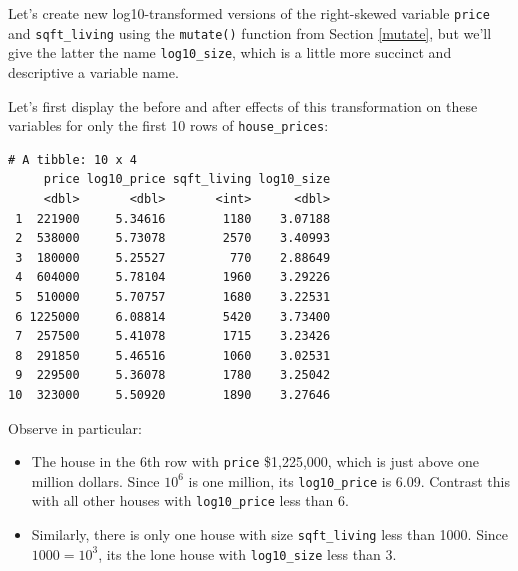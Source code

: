 \documentclass[12pt, krantz2,]{krantz}
\makeatletter
\newenvironment{Shaded}{\begin{snugshade}}{\end{snugshade}}
\newcommand{\DataTypeTok}[1]{\textcolor[rgb]{0.27,0.27,0.27}{#1}}
\newcommand{\KeywordTok}[1]{\textcolor[rgb]{0.27,0.27,0.27}{\textbf{#1}}}
\newcommand{\NormalTok}[1]{#1}
\newcommand{\OperatorTok}[1]{\textcolor[rgb]{0.43,0.43,0.43}{\textbf{#1}}}
\newcommand{\StringTok}[1]{\textcolor[rgb]{0.5,0.5,0.5}{#1}}
\providecommand{\tightlist}{%
  \setlength{\itemsep}{0pt}\setlength{\parskip}{0pt}}
\newenvironment{kframe}{%
\medskip{}
\setlength{\fboxsep}{.8em}
 \def\at@end@of@kframe{}%
 \ifinner\ifhmode%
  \def\at@end@of@kframe{\end{minipage}}%
  \begin{minipage}{\columnwidth}%
 \fi\fi%
 \def\FrameCommand##1{\hskip\@totalleftmargin \hskip-\fboxsep
 \colorbox{shadecolor}{##1}\hskip-\fboxsep
     \hskip-\linewidth \hskip-\@totalleftmargin \hskip\columnwidth}%
 \MakeFramed {\advance\hsize-\width
   \@totalleftmargin\z@ \linewidth\hsize
   \@setminipage}}%
 {\par\unskip\endMakeFramed%
 \at@end@of@kframe}
\renewenvironment{Shaded}{\begin{kframe}}{\end{kframe}}
\makeatother
\begin{document}
Let's create new log10-transformed versions of the right-skewed variable \texttt{price} and \texttt{sqft\_living} using the \texttt{mutate()} function from Section \ref{mutate}, but we'll give the latter the name \texttt{log10\_size}, which is a little more succinct and descriptive a variable name.

\begin{Shaded}
\end{Shaded}

Let's first display the before and after effects of this transformation on these variables for only the first 10 rows of \texttt{house\_prices}:

\begin{Shaded}
\end{Shaded}

\begin{verbatim}
# A tibble: 10 x 4
     price log10_price sqft_living log10_size
     <dbl>       <dbl>       <int>      <dbl>
 1  221900     5.34616        1180    3.07188
 2  538000     5.73078        2570    3.40993
 3  180000     5.25527         770    2.88649
 4  604000     5.78104        1960    3.29226
 5  510000     5.70757        1680    3.22531
 6 1225000     6.08814        5420    3.73400
 7  257500     5.41078        1715    3.23426
 8  291850     5.46516        1060    3.02531
 9  229500     5.36078        1780    3.25042
10  323000     5.50920        1890    3.27646
\end{verbatim}

Observe in particular:

\begin{itemize}
\tightlist
\item
  The house in the 6th row with \texttt{price} \$1,225,000, which is just above one million dollars. Since \(10^6\) is one million, its \texttt{log10\_price} is 6.09. Contrast this with all other houses with \texttt{log10\_price} less than 6.
\item
  Similarly, there is only one house with size \texttt{sqft\_living} less than 1000. Since \(1000 = 10^3\), its the lone house with \texttt{log10\_size} less than 3.
\end{itemize}
\end{document}
